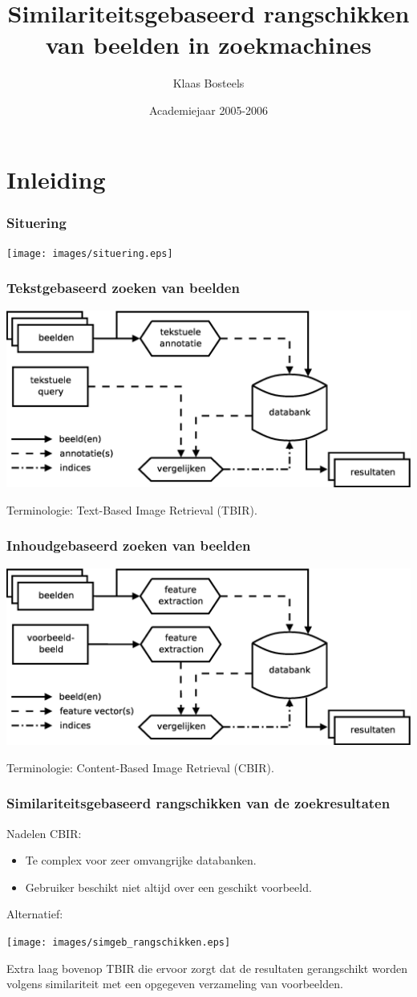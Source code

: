 \documentclass[dutch]{beamer}
\title{Similariteitsgebaseerd rangschikken van beelden in zoekmachines}
\author{Klaas Bosteels}
\date{Academiejaar 2005-2006}
\theoremstyle{definition}
\theoremstyle{remark}
\theoremstyle{example}
\begin{document}
\plainframe{\titlepage}

\section{Inleiding}
\frame
{
  \frametitle{Situering}
  
  \begin{center}
  \texttt{[image: images/situering.eps]}
  \end{center}
}
\frame
{
  \frametitle{Tekstgebaseerd zoeken van beelden}

  \begin{center}
  \includegraphics[width=\textwidth]{images/tbir.eps}
  \end{center}

  Terminologie: Text-Based Image Retrieval (TBIR).
}
\frame
{
  \frametitle{Inhoudgebaseerd zoeken van beelden}

  \begin{center}
  \includegraphics[width=\textwidth]{images/cbir.eps}
  \end{center}

  Terminologie: Content-Based Image Retrieval (CBIR).
}
\frame
{
  \frametitle{Similariteitsgebaseerd rangschikken van de zoekresultaten}
  
  Nadelen CBIR:
  \begin{itemize}
    \item Te complex voor zeer omvangrijke databanken.
    \item Gebruiker beschikt niet altijd over een geschikt voorbeeld.
  \end{itemize}

  Alternatief:
  \begin{center}
  \texttt{[image: images/simgeb\_rangschikken.eps]}
  \end{center}
  Extra laag bovenop TBIR die ervoor zorgt dat de resultaten gerangschikt
  worden volgens similariteit met een opgegeven verzameling van voorbeelden.
}
\end{document}
